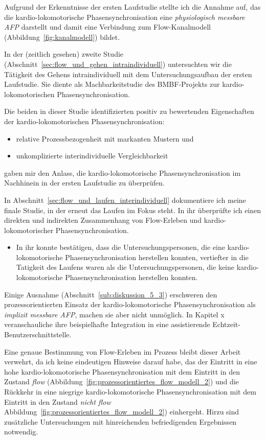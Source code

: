 Aufgrund der Erkenntnisse der ersten Laufstudie stellte ich die Annahme auf, das die kardio-lokomotorische Phasensynchronisation eine \emph{physiologisch messbare \ac{AFP}} darstellt und damit eine Verbindung zum Flow-Kanalmodell (Abbildung~\ref{fig:kanalmodell}) bildet.

In der (zeitlich gesehen) zweite Studie (Abschnitt~\ref{sec:flow_und_gehen_intraindividuell}) untersuchten wir die Tätigkeit des Gehens intraindividuell mit dem Untersuchungsaufbau der ersten Laufstudie. Sie diente als Machbarkeitstudie des \acs{BMBF}-Projekts zur kardio-lokomotorischen Phasensynchronisation. 

Die beiden in dieser Studie identifizierten positiv zu bewertenden Eigenschaften der kardio-lokomotorischen Phasensynchronisation: 
\begin{itemize}
	
	\item relative Prozessbezogenheit mit markanten Mustern und
	
	\item unkomplizierte interindividuelle Vergleichbarkeit 
\end{itemize}

gaben mir den Anlass, die kardio-lokomotorische Phasensynchronisation im Nachhinein in der ersten Laufstudie zu überprüfen. 

In Abschnitt~\ref{sec:flow_und_laufen_interindividuell} dokumentiere ich meine finale Studie, in der erneut das Laufen im Fokus steht. In ihr überprüfte ich einen direkten und indirekten Zusammenhang von Flow-Erleben und kardio-lokomotorischer Phasensynchronisation. 
\begin{itemize}
	
	\item In ihr konnte bestätigen, dass die Untersuchungspersonen, die eine kardio-lokomotorische Phasensynchronisation herstellen konnten, vertiefter in die Tatigkeit des Laufens waren als die Untersuchungspersonen, die keine kardio-lokomotorische Phasensynchronisation herstellen konnten. 
\end{itemize}

Einige Ausnahme (Abschnitt~\ref{sub:diskussion_5_3}) erschweren den prozessorientierten Einsatz der kardio-lokomotorische Phasensynchronisation als \emph{implizit messbare \ac{AFP}}, machen sie aber nicht unmöglich. In Kapitel x veranschauliche ihre beispielhafte Integration in eine assistierende Echtzeit-Benutzerschnittstelle.

Eine genaue Bestimmung von Flow-Erleben im Prozess bleibt dieser Arbeit verwehrt, da ich keine eindeutigen Hinweise darauf habe, das der Eintritt in eine hohe kardio-lokomotorische Phasensynchronisation mit dem Eintritt in den Zustand \emph{flow} (Abbildung~\ref{fig:prozessorientiertes_flow_modell_2}) und die Rückkehr in eine niegrige kardio-lokomotorische Phasensynchronisation mit dem Eintritt in den Zustand \emph{nicht flow} Abbildung~\ref{fig:prozessorientiertes_flow_modell_2}) einhergeht. Hirzu sind zusätzliche Untersuchungen mit hinreichenden befriedigenden Ergebnissen notwendig.
